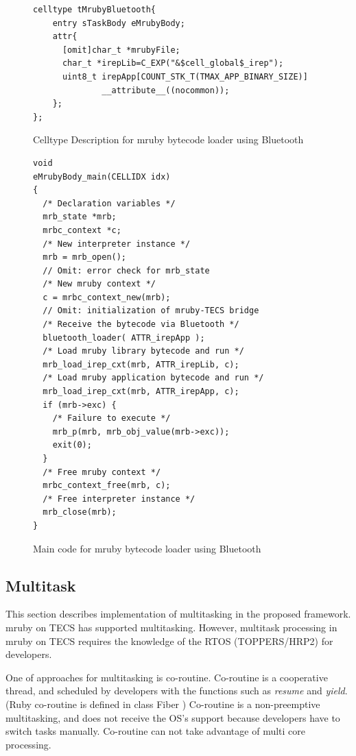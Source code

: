 \documentclass[conference,compsoc]{IEEEtran}
\begin{document}
\begin{figure}[t]
\centering
\begin{lstlisting}
celltype tMrubyBluetooth{
    entry sTaskBody eMrubyBody;
    attr{
      [omit]char_t *mrubyFile;
      char_t *irepLib=C_EXP("&$cell_global$_irep");
      uint8_t irepApp[COUNT_STK_T(TMAX_APP_BINARY_SIZE)]
              __attribute__((nocommon));
    };
};
\end{lstlisting}
\caption{Celltype Description for mruby bytecode loader using Bluetooth}
\label{celltype_mrubybluetooth}
\end{figure}

\begin{figure}[t]
\centering
\begin{lstlisting}
void
eMrubyBody_main(CELLIDX idx)
{
  /* Declaration variables */
  mrb_state *mrb;
  mrbc_context *c;
  /* New interpreter instance */
  mrb = mrb_open();
  // Omit: error check for mrb_state
  /* New mruby context */
  c = mrbc_context_new(mrb);
  // Omit: initialization of mruby-TECS bridge
  /* Receive the bytecode via Bluetooth */
  bluetooth_loader( ATTR_irepApp );
  /* Load mruby library bytecode and run */
  mrb_load_irep_cxt(mrb, ATTR_irepLib, c);
  /* Load mruby application bytecode and run */
  mrb_load_irep_cxt(mrb, ATTR_irepApp, c);
  if (mrb->exc) {
    /* Failure to execute */
    mrb_p(mrb, mrb_obj_value(mrb->exc));
    exit(0);
  }
  /* Free mruby context */
  mrbc_context_free(mrb, c);
  /* Free interpreter instance */
  mrb_close(mrb);
}

\end{lstlisting}
\caption{Main code for mruby bytecode loader using Bluetooth}
\label{maincode_mrubybluetooth}
\end{figure}
\subsection{Multitask}
\label{sec:Multitask}
This section describes implementation of multitasking in the proposed framework.
mruby on TECS has supported multitasking.
However, multitask processing in mruby on TECS requires the knowledge of the RTOS (TOPPERS/HRP2) for developers.

One of approaches for multitasking is co-routine.
Co-routine is a cooperative thread, and scheduled by developers with the functions such as {\it resume} and {\it yield}. 
(Ruby co-routine is defined in class Fiber \cite{url:co-routine})
Co-routine is a non-preemptive multitasking, and does not receive the OS's support because developers have to switch tasks manually.
Co-routine can not take advantage of multi core processing.
\end{document}

